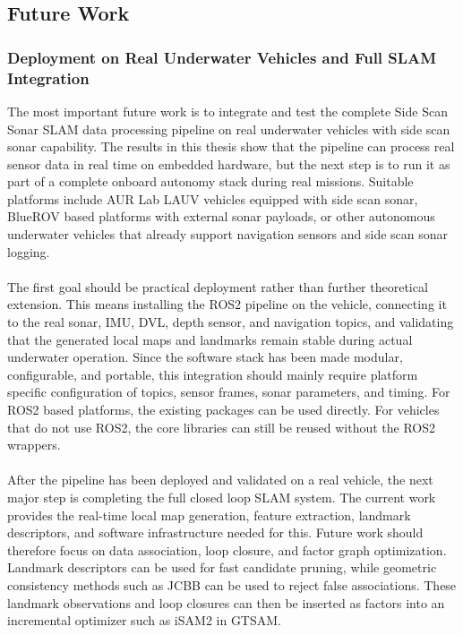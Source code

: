 \subsection{Future Work}
\subsubsection{Deployment on Real Underwater Vehicles and Full SLAM Integration}
The most important future work is to integrate and test the complete Side Scan Sonar SLAM data processing pipeline on real underwater vehicles with side scan sonar capability. The results in this thesis show that the pipeline can process real sensor data in real time on embedded hardware, but the next step is to run it as part of a complete onboard autonomy stack during real missions. Suitable platforms include AUR Lab LAUV vehicles equipped with side scan sonar, BlueROV based platforms with external sonar payloads, or other autonomous underwater vehicles that already support navigation sensors and side scan sonar logging.
\\ \\
The first goal should be practical deployment rather than further theoretical extension. This means installing the ROS2 pipeline on the vehicle, connecting it to the real sonar, IMU, DVL, depth sensor, and navigation topics, and validating that the generated local maps and landmarks remain stable during actual underwater operation. Since the software stack has been made modular, configurable, and portable, this integration should mainly require platform specific configuration of topics, sensor frames, sonar parameters, and timing. For ROS2 based platforms, the existing packages can be used directly. For vehicles that do not use ROS2, the core libraries can still be reused without the ROS2 wrappers.
\\ \\
After the pipeline has been deployed and validated on a real vehicle, the next major step is completing the full closed loop SLAM system. The current work provides the real-time local map generation, feature extraction, landmark descriptors, and software infrastructure needed for this. Future work should therefore focus on data association, loop closure, and factor graph optimization. Landmark descriptors can be used for fast candidate pruning, while geometric consistency methods such as JCBB can be used to reject false associations. These landmark observations and loop closures can then be inserted as factors into an incremental optimizer such as iSAM2 in GTSAM.

